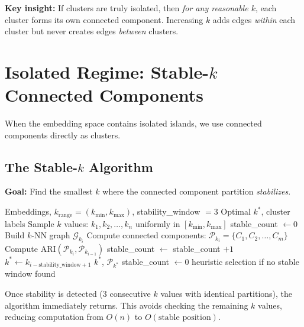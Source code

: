 \documentclass[11pt,a4paper]{article}
\newcommand{\set}[1]{\mathcal{#1}}
\begin{document}
\textbf{Key insight:} If clusters are truly isolated, then \textit{for any reasonable $k$}, each cluster forms its own connected component. Increasing $k$ adds edges \textit{within} each cluster but never creates edges \textit{between} clusters.

\section{Isolated Regime: Stable-$k$ Connected Components}

When the embedding space contains isolated islands, we use connected components directly as clusters.

\subsection{The Stable-$k$ Algorithm}

\textbf{Goal:} Find the smallest $k$ where the connected component partition \textit{stabilizes}.

\begin{algorithm}[H]
\caption{Find Stable $k$ (with Early Exit)}
\begin{algorithmic}[1]
\Require Embeddings, $k_{\text{range}} = (k_{\min}, k_{\max})$, stability\_window $= 3$
\Ensure Optimal $k^*$, cluster labels
\State Sample $k$ values: $k_1, k_2, \ldots, k_n$ uniformly in $[k_{\min}, k_{\max}]$
\State stable\_count $\gets 0$
    \State Build $k$-NN graph $\set{G}_{k_i}$
    \State Compute connected components: $\set{P}_{k_i} = \{C_1, C_2, \ldots, C_m\}$
        \State Compute $\text{ARI}(\set{P}_{k_i}, \set{P}_{k_{i-1}})$
            \State stable\_count $\gets$ stable\_count $+ 1$
                \State $k^* \gets k_{i - \text{stability\_window} + 1}$ 
                \State \Return $k^*$, $\set{P}_{k^*}$ 
            \EndIf
        \Else
            \State stable\_count $\gets 0$
        \EndIf
    \EndIf
\EndFor
\State \Return heuristic selection if no stable window found
\end{algorithmic}
\end{algorithm}

\begin{tcolorbox}[colback=green!5,colframe=green!40!black,title=Efficiency: Early Exit]
Once stability is detected (3 consecutive $k$ values with identical partitions), the algorithm immediately returns. This avoids checking the remaining $k$ values, reducing computation from $O(n)$ to $O(\text{stable position})$.
\end{tcolorbox}
\end{document}
